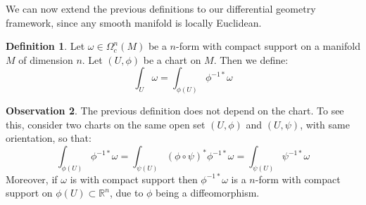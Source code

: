 \documentclass[12pt,a4paper]{report}
\theoremstyle{definition}
\newtheorem{Def}{Definition}[chapter]
\theoremstyle{Theorem}
\theoremstyle{definition}
\theoremstyle{definition}
\newtheorem{Obs}[Def]{Observation}
\begin{document}
	We can now extend the previous definitions to our differential geometry framework, since any smooth manifold is locally Euclidean.
	\begin{Def}
		Let $\omega\in\Omega^n_c(M)$ be a $n$-form with compact support on a manifold $M$ of dimension $n$. Let $(U,\phi)$ be a chart on $M$. Then we define:
		$$\int_U\omega=\int_{\phi(U)}\phi^{-1*}\omega$$
	\end{Def}
	\begin{Obs}
		The previous definition does not depend on the chart. To see this, consider two charts on the same open set $(U,\phi)$ and $(U,\psi)$, with same orientation, so that:
		$$\int_{\phi(U)}\phi^{-1*}\omega=\int_{\psi(U)}(\phi\circ\psi)^*\phi^{-1*}\omega=\int_{\psi(U)}\psi^{-1*}\omega$$
		Moreover, if $\omega$ is with compact support then $\phi^{-1*}\omega$ is a $n$-form with compact support on $\phi(U)\subset\mathbb{R}^n$, due to $\phi$ being a diffeomorphism. 
	\end{Obs}
\end{document}

